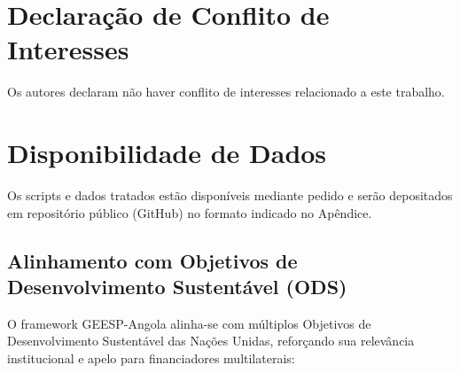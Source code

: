 \documentclass[12pt, a4paper]{article}
\begin{document}
\section*{Declaração de Conflito de Interesses}
Os autores declaram não haver conflito de interesses relacionado a este trabalho.

\section*{Disponibilidade de Dados}
Os scripts e dados tratados estão disponíveis mediante pedido e serão depositados em repositório público (GitHub) no formato indicado no Apêndice.

\subsection{Alinhamento com Objetivos de Desenvolvimento Sustentável (ODS)}

O framework GEESP-Angola alinha-se com múltiplos Objetivos de Desenvolvimento Sustentável das Nações Unidas, reforçando sua relevância institucional e apelo para financiadores multilaterais:
\end{document}
